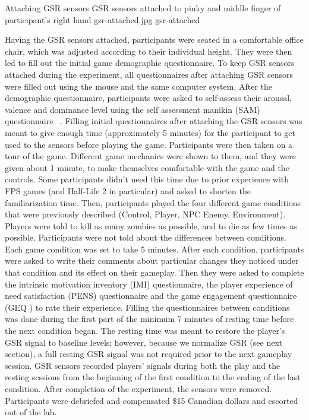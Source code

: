 \img
{Attaching GSR sensors}
{GSR sensors attached to pinky and middle finger of participant's right hand}
{gsr-attached.jpg}
{gsr-attached}

Having the GSR sensors attached, participants were seated in a comfortable office chair, which was adjusted according to their individual height. They were then led to fill out the initial game demographic questionnaire. To keep GSR sensors attached during the experiment, all questionnaires after attaching GSR sensors were filled out using the mouse and the same computer system. After the demographic questionnaire, participants were asked to self-assess their arousal, valence and dominance level using the self assessment manikin (SAM) questionnaire ~\cite{bradley1994measuring}. Filling initial questionnaires after attaching the GSR sensors was meant to give enough time (approximately 5 minutes) for the participant to get used to the sensors before playing the game. Participants were then taken on a tour of the game. Different game mechanics were shown to them, and they were given about 1 minute, to make themselves comfortable with the game and the controls. Some participants didn't need this time due to prior experience with FPS games (and Half-Life 2 in particular) and asked to shorten the familiarization time. Then, participants played the four different game conditions that were previously described (Control, Player, NPC Enemy, Environment). Players were told to kill as many zombies as possible, and to die as few times as possible. Participants were not told about the differences between conditions. Each game condition was set to take 5 minutes. After each condition, participants were asked to write their comments about particular changes they noticed under that condition and its effect on their gameplay. Then they were asked to complete the intrinsic motivation inventory (IMI) questionnaire, the player experience of need satisfaction (PENS) questionnaire and the game engagement questionnaire (GEQ ) to rate their experience. Filling the questionnaires between conditions was done during the first part of the minimum 7 minutes of resting time before the next condition began. The resting time was meant to restore the player's GSR signal to baseline levels; however, because we normalize GSR (see next section), a full resting GSR signal was not required prior to the next gameplay session. GSR sensors recorded players' signals during both the play and the resting sessions from the beginning of the first condition to the ending of the last condition. After completion of the experiment, the sensors were removed. Participants were debriefed and compensated \$15 Canadian dollars and escorted out of the lab.

